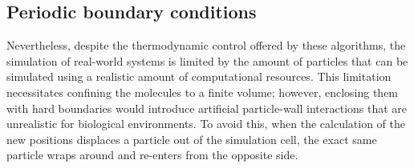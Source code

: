 








































\subsection{Periodic boundary conditions}
Nevertheless, despite the thermodynamic control offered by these algorithms, the simulation of real-world systems is limited by the amount of particles that can be simulated using a realistic amount of computational resources. This limitation necessitates confining the molecules to a finite volume; however, enclosing them with hard boundaries would introduce artificial particle-wall interactions that are unrealistic for biological environments. To avoid this, when the calculation of the new positions displaces a particle out of the simulation cell, the exact same particle wraps around and re-enters from the opposite side.


